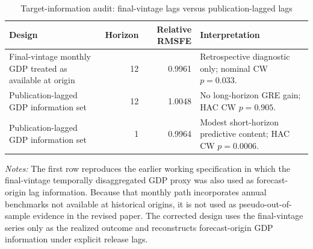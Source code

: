 \begin{table}[htbp]
\centering\small\singlespacing
\caption{Target-information audit: final-vintage lags versus publication-lagged lags}
\label{tab:target_audit}
\begin{tabularx}{\textwidth}{p{}rrX}
\toprule
Design & Horizon & Relative RMSFE & Interpretation \\
\midrule
Final-vintage monthly GDP treated as available at origin & 12 & 0.9961 & Retrospective diagnostic only; nominal CW $p=0.033$. \\
Publication-lagged GDP information set & 12 & 1.0048 & No long-horizon GRE gain; HAC CW $p=0.905$. \\
Publication-lagged GDP information set & 1 & 0.9964 & Modest short-horizon predictive content; HAC CW $p=0.0006$. \\
\bottomrule
\end{tabularx}
\vspace{0.35em}
\begin{minipage}{0.97\textwidth}\footnotesize\textit{Notes:} The first row reproduces the earlier working specification in which the final-vintage temporally disaggregated GDP proxy was also used as forecast-origin lag information. Because that monthly path incorporates annual benchmarks not available at historical origins, it is not used as pseudo-out-of-sample evidence in the revised paper. The corrected design uses the final-vintage series only as the realized outcome and reconstructs forecast-origin GDP information under explicit release lags.\end{minipage}
\end{table}
